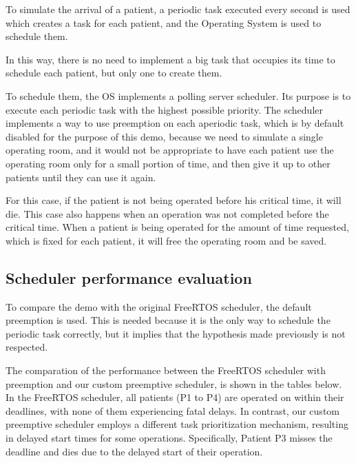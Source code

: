 \documentclass[a4paper, 10pt, oneside]{article} %
\begin{document}
To simulate the arrival of a patient, a periodic task executed every second is used which creates a task for each patient, and the Operating System is used to schedule them.

In this way, there is no need to implement a big task that occupies its time to schedule each patient, but only one to create them.

To schedule them, the OS implements a polling server scheduler. Its purpose is to execute each periodic task with the highest possible priority.
The scheduler implements a way to use preemption on each aperiodic task, which is by default disabled for the purpose of this demo, because we need to simulate a single operating room, and it would not be appropriate to have each patient use the operating room only for a small portion of time, and then give it up to other patients until they can use it again.


For this case, if the patient is not being operated before his critical time, it will die. This case also happens when an operation was not completed before the critical time. When a patient is being operated for the amount of time requested, which is fixed for each patient, it will free the operating room and be saved.


\subsection{Scheduler performance evaluation}

To compare the demo with the original FreeRTOS scheduler, the default preemption is used. This is needed because it is the only way to schedule the periodic task correctly, but it implies that the hypothesis made previously is not respected.

The comparation of the performance between the FreeRTOS scheduler with preemption and our custom preemptive scheduler, is shown in the tables below. In the FreeRTOS scheduler, all patients (P1 to P4) are operated on within their deadlines, with none of them experiencing fatal delays. In contrast, our custom preemptive scheduler employs a different task prioritization mechanism, resulting in delayed start times for some operations. Specifically, Patient P3 misses the deadline and dies due to the delayed start of their operation.
\end{document}
